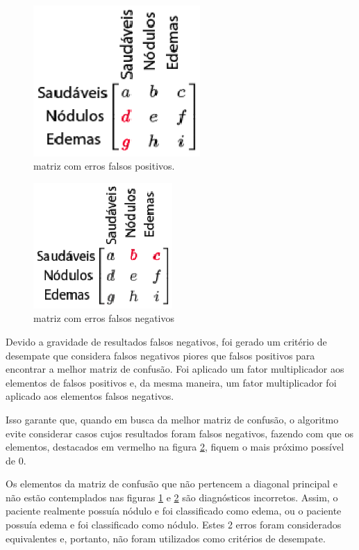 \documentclass[a4paper,12pt,oneside]{report}
\begin{document}
\begin{figure}[H]
\centering
\includegraphics[width=180pt]{matriz_falso_positivo.eps}
\caption{matriz com erros falsos positivos.}
\label{fig:falso_positivo}
\end{figure}
\begin{figure}[H]
\centering
\includegraphics[width=150pt]{matriz_falso_negativo.eps}
\caption{matriz com erros falsos negativos}
\label{fig:falso_negativo}
\end{figure}
\par Devido a gravidade de resultados falsos negativos, foi gerado um crit\'{e}rio de desempate que considera falsos negativos piores que falsos positivos para encontrar a melhor matriz de confus\~{a}o. Foi aplicado um fator multiplicador aos elementos de falsos positivos e, da mesma maneira, um fator multiplicador foi aplicado aos elementos falsos negativos. 
\\
\par Isso garante que, quando em busca da melhor matriz de confus\~{a}o, o 	algoritmo evite considerar casos cujos resultados foram falsos negativos, fazendo com que os elementos, destacados em vermelho  na figura \ref{fig:falso_negativo}, fiquem o mais pr\'{o}ximo poss\'{i}vel de 0. 
\\
\par Os elementos da matriz de confus\~{a}o que n\~{a}o pertencem a diagonal principal e n\~{a}o est\~{a}o contemplados nas figuras \ref{fig:falso_positivo} e \ref{fig:falso_negativo} s\~{a}o diagn\'{o}sticos incorretos. Assim, o paciente realmente possu\'{i}a n\'{o}dulo e foi classificado como edema, ou o paciente possu\'{i}a edema e foi classificado como n\'{o}dulo. Estes 2 erros foram considerados equivalentes e, portanto, n\~{a}o foram utilizados como crit\'{e}rios de desempate. 
\end{document}
